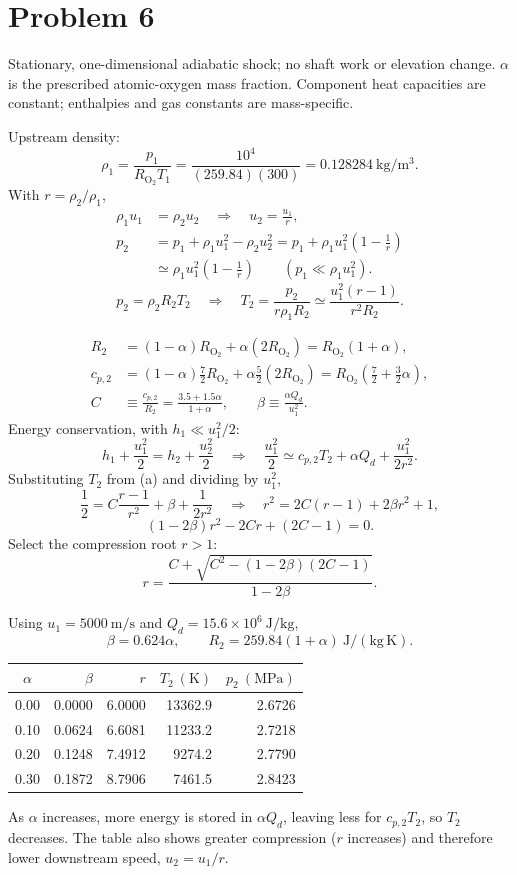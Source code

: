 \section*{Problem 6}
Stationary, one-dimensional adiabatic shock; no shaft work or elevation change.
$\alpha$ is the prescribed atomic-oxygen mass fraction. Component heat capacities
are constant; enthalpies and gas constants are mass-specific.

Upstream density:
\[
\rho_1=\frac{p_1}{R_{\mathrm{O_2}}T_1}
=\frac{10^4}{(259.84)(300)}
=0.128284~\mathrm{kg/m^3}.
\]
With $r=\rho_2/\rho_1$,
\begin{align*}
\rho_1u_1&=\rho_2u_2
\quad\Longrightarrow\quad u_2=\frac{u_1}{r},\\
p_2&=p_1+\rho_1u_1^2-\rho_2u_2^2
=p_1+\rho_1u_1^2\left(1-\frac1r\right)\\
&\simeq\boxed{\rho_1u_1^2\left(1-\frac1r\right)}
\qquad (p_1\ll\rho_1u_1^2).
\end{align*}
\[
p_2=\rho_2R_2T_2
\quad\Longrightarrow\quad
T_2=\frac{p_2}{r\rho_1R_2}
\simeq\boxed{\frac{u_1^2(r-1)}{r^2R_2}}.
\]

\begin{align*}
R_2&=(1-\alpha)R_{\mathrm{O_2}}+\alpha(2R_{\mathrm{O_2}})
=R_{\mathrm{O_2}}(1+\alpha),\\
c_{p,2}&=(1-\alpha)\frac72R_{\mathrm{O_2}}
+\alpha\frac52(2R_{\mathrm{O_2}})
=R_{\mathrm{O_2}}\left(\frac72+\frac32\alpha\right),\\
C&\equiv\frac{c_{p,2}}{R_2}
=\frac{3.5+1.5\alpha}{1+\alpha},\qquad
\beta\equiv\frac{\alpha Q_d}{u_1^2}.
\end{align*}
Energy conservation, with $h_1\ll u_1^2/2$:
\[
h_1+\frac{u_1^2}{2}=h_2+\frac{u_2^2}{2}
\quad\Longrightarrow\quad
\frac{u_1^2}{2}\simeq c_{p,2}T_2+\alpha Q_d+\frac{u_1^2}{2r^2}.
\]
Substituting $T_2$ from (a) and dividing by $u_1^2$,
\[
\frac12=C\frac{r-1}{r^2}+\beta+\frac{1}{2r^2}
\quad\Longrightarrow\quad
r^2=2C(r-1)+2\beta r^2+1,
\]
\[
\boxed{(1-2\beta)r^2-2Cr+(2C-1)=0.}
\]
Select the compression root $r>1$:
\[
\boxed{r=\frac{C+\sqrt{C^2-(1-2\beta)(2C-1)}}{1-2\beta}.}
\]

Using $u_1=5000~\mathrm{m/s}$ and $Q_d=15.6\times10^6~\mathrm{J/kg}$,
\[
\beta=0.624\alpha,\qquad
R_2=259.84(1+\alpha)~\mathrm{J/(kg\,K)}.
\]
\begin{center}
\renewcommand{\arraystretch}{1.15}
\begin{tabular}{c r r r r}
\hline
$\alpha$ & $\beta$ & $r$ & $T_2~(\mathrm K)$ & $p_2~(\mathrm{MPa})$ \\
\hline
0.00 & 0.0000 & 6.0000 & 13362.9 & 2.6726 \\
0.10 & 0.0624 & 6.6081 & 11233.2 & 2.7218 \\
0.20 & 0.1248 & 7.4912 &  9274.2 & 2.7790 \\
0.30 & 0.1872 & 8.7906 &  7461.5 & 2.8423 \\
\hline
\end{tabular}
\end{center}

As $\alpha$ increases, more energy is stored in $\alpha Q_d$, leaving less for
$c_{p,2}T_2$, so $T_2$ decreases. The table also shows greater compression
($r$ increases) and therefore lower downstream speed, $u_2=u_1/r$.
